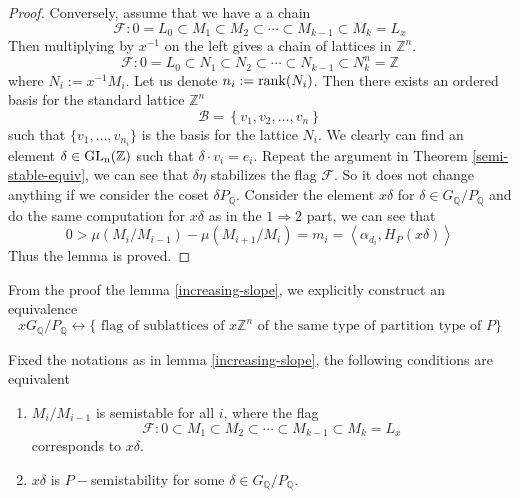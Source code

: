 \begin{proof}
    Conversely, assume that we have a a chain
    \[\mathcal{F}: 0 = L_0 \subset M_1 \subset M_2 \subset \cdots \subset M_{k-1} \subset M_k = L_x \]
    Then multiplying by $x^{-1}$ on the left gives a chain of lattices in $\mathbb{Z}^n$.
    \[\mathcal{F}: 0 = L_0 \subset N_1 \subset N_2 \subset \cdots \subset N_{k-1} \subset N_k ^n= \mathbb{Z} \]
    where $N_i:= x^{-1}M_i$. Let us denote $n_i:=\operatorname{rank}(N_i)$. Then there exists an ordered
    basis for the standard lattice $\mathbb{Z}^n$
    \[\mathcal{B} = \left\lbrace v_1,v_2,\ldots, v_n \right\rbrace\]
    such that $\{v_1,\ldots,v_{n_i}\}$ is the basis for the lattice $N_i$. We clearly can find an element
    $\delta \in \operatorname{GL_n(\mathbb{Z})}$ such that $\delta\cdot v_i = e_i$. Repeat the argument in Theorem \ref{semi-stable-equiv}, we can see that
    $\delta\eta$ stabilizes the flag $\mathcal{F}$. So it does not change anything if we consider the coset $\delta P_\mathbb{Q}$.
    Consider the element $x\delta$ for $\delta \in G_\mathbb{Q}/P_\mathbb{Q}$ and do the same computation for
    $x\delta$ as in the $1 \Rightarrow 2$ part, we can see that
    \[0 > \mu(M_i/M_{i-1})-\mu(M_{i+1}/M_i)= m_i =\left\langle\alpha_{d_i},H_P(x\delta) \right\rangle\]
    Thus the lemma is proved.
\end{proof}
\begin{remark}
    From the proof the lemma \ref{increasing-slope}, we explicitly construct an equivalence
    \[xG_\mathbb{Q}/P_\mathbb{Q} \longleftrightarrow \{\mbox{ flag of sublattices of $x\mathbb{Z}^n$ of the same type of partition type of $P$}\}\]

\end{remark}
\begin{lemma}\label{ss-slope}
    Fixed the notations as in lemma \ref{increasing-slope}, the following conditions are equivalent
    \begin{enumerate}
        \item $M_i/M_{i-1}$ is semistable for all $i$, where the flag
              \[\mathcal{F}: 0  \subset M_1 \subset M_2 \subset \cdots \subset M_{k-1} \subset M_k = L_x \]
              corresponds to $x\delta$.
        \item $x\delta$ is $P-$semistability for some $\delta \in G_\mathbb{Q}/P_\mathbb{Q}$.
    \end{enumerate}
\end{lemma}
